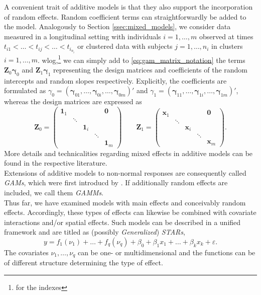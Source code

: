 A convenient trait of additive models is that they also support the incorporation of random effects. Random coefficient terms can straightforwardly be added to the model.
Analogously to Section \ref{ssec:mixed_models}, we consider data measured in a longitudinal setting with individuals  $i=1, \ldots, m$ observed at times $t_{i1} < \ldots < t_{ij} < \ldots < t_{i_{n_i}}$ or clustered data with subjects $j=1, \ldots, n_i$ in clusters $i=1, \ldots, m$. \Ac{wlog},\footnote{for the indexes} we can simply add to \autoref{eq:gam_matrix_notation} the terms $\bm{Z}_0 \bm{\gamma}_0$ and $\bm{Z}_1 \bm{\gamma}_1$ representing the design matrices and coefficients of the random intercepts and random slopes respectively. Explicitly, the coefficients are formulated as $\gamma_{0}=\left(\bm{\gamma}_{01}, \ldots, \bm{\gamma}_{0 i}, \ldots, \bm{\gamma}_{0 m}\right)'$ and $\gamma_{1}=\left(\bm{\gamma}_{11}, \ldots, \bm{\gamma}_{1 i}, \ldots, \bm{\gamma}_{1 m}\right)'$, whereas the design matrices are expressed as
$$
\bm{Z}_0 =
\left(
\begin{matrix}
\bm{1}_1 &  &  &  & \bm{0} \\ 
 & \ddots &  &  &  \\ 
 &  & \bm{1}_i &  &  \\ 
 &  &  & \ddots &  \\ 
 &  &  &  & \bm{1}_m
\end{matrix} 
\right)
\qquad
\bm{Z}_1 =
\left(
\begin{matrix}
\bm{x}_1 &  &  &  & \bm{0} \\ 
 & \ddots &  &  &  \\ 
 &  & \bm{x}_i &  &  \\ 
 &  &  & \ddots &  \\ 
 &  &  &  & \bm{x}_m
\end{matrix} 
\right).
$$
More details and technicalities regarding mixed effects in additive models can be found in the respective literature.\\


Extensions of additive models to non-normal responses are consequently called \textit{\acp{GAM}}, which were first introducd by \cite{hastie1986}. If additionally random effects are included, we call them \textit{\acp{GAMM}}.\\

Thus far, we have examined models with main effects and conceivably random effects. Accordingly, these types of effects can likewise be combined with covariate interactions and/or spatial effects. Such models can be described in a unified framework and are titled as (possibly \textit{Generalized}) \textit{\acp{STAR}},
$$
y=f_{1}\left(\nu_{1}\right)+\ldots+f_{q}\left(\nu_{q}\right)+\beta_{0}+\beta_{1} x_{1}+\ldots+\beta_{k} x_{k}+\varepsilon.
$$
The covariates $\nu_1, \ldots, \nu_q$ can be one- or multidimensional and the functions can be of different structure determining the type of effect.




